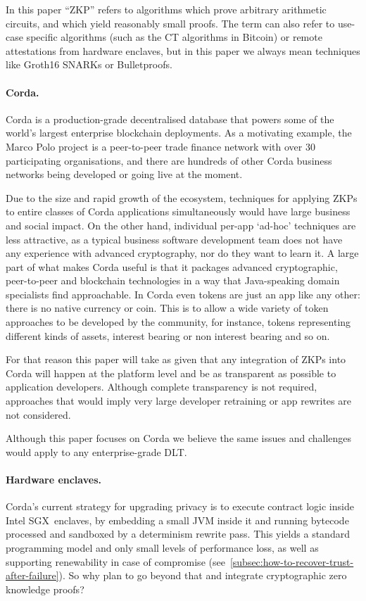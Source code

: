 \documentclass{article}
\begin{document}
In this paper ``ZKP'' refers to algorithms which prove arbitrary arithmetic circuits, and which yield reasonably
small proofs. The term can also refer to use-case specific algorithms (such as the CT algorithms in Bitcoin) or
remote attestations from hardware enclaves, but in this paper we always mean techniques like Groth16 SNARKs\cite{groth2016}
or Bulletproofs.

\paragraph{Corda.}Corda is a production-grade decentralised database that powers some of the world's largest
enterprise blockchain deployments. As a motivating example, the Marco Polo project is a peer-to-peer
trade finance network with over 30 participating organisations, and there are hundreds of other Corda business
networks being developed or going live at the moment.

Due to the size and rapid growth of the ecosystem, techniques for applying ZKPs to entire classes of Corda
applications simultaneously would have large business and social impact. On the other hand, individual per-app
`ad-hoc' techniques are less attractive, as a typical business software development team does not have any
experience with advanced cryptography, nor do they want to learn it. A large part of what makes Corda useful is that
it packages advanced cryptographic, peer-to-peer and blockchain technologies in a way that Java-speaking domain
specialists find approachable. In Corda even tokens are just an app like any other: there is no native
currency or coin. This is to allow a wide variety of token approaches to be developed by the community, for
instance, tokens representing different kinds of assets, interest bearing or non interest bearing and so on.

For that reason this paper will take as given that any integration of ZKPs into Corda will happen at the platform
level and be as transparent as possible to application developers. Although complete transparency is not required,
approaches that would imply very large developer retraining or app rewrites are not considered.

Although this paper focuses on Corda we believe the same issues and challenges would apply to any enterprise-grade DLT.

\paragraph{Hardware enclaves.}Corda's current strategy for upgrading privacy is to execute contract logic inside
Intel SGX\texttrademark~enclaves, by embedding a small JVM inside it and running bytecode processed and sandboxed
by a determinism rewrite pass. This yields a standard programming model and only small levels of performance loss,
as well as supporting renewability in case of compromise (see~\cref{subsec:how-to-recover-trust-after-failure}). So
why plan to go beyond that and integrate cryptographic zero knowledge proofs?
\end{document}
